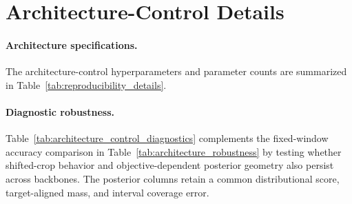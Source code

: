 \documentclass[12pt]{article}
\begin{document}
\FloatBarrier

\section{Architecture-Control Details}
\label{app:architecture_controls}

\paragraph{Architecture specifications.}
The architecture-control hyperparameters and parameter counts are summarized
in Table~\ref{tab:reproducibility_details}.

\paragraph{Diagnostic robustness.}
Table~\ref{tab:architecture_control_diagnostics} complements the fixed-window
accuracy comparison in Table~\ref{tab:architecture_robustness} by testing
whether shifted-crop behavior and objective-dependent posterior geometry also
persist across backbones. The posterior columns retain a common distributional
score, target-aligned mass, and interval coverage error.
\end{document}
